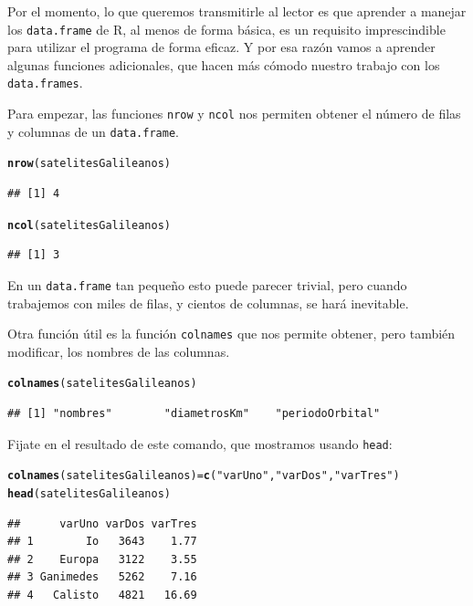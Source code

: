 \documentclass[10pt,a4paper]{article}\usepackage[]{graphicx}\usepackage[]{color}
\makeatletter
\newcommand{\hlstr}[1]{\textcolor[rgb]{0.192,0.494,0.8}{#1}}%
\newcommand{\hlstd}[1]{\textcolor[rgb]{0.345,0.345,0.345}{#1}}%
\newcommand{\hlkwb}[1]{\textcolor[rgb]{0.69,0.353,0.396}{#1}}%
\newcommand{\hlkwd}[1]{\textcolor[rgb]{0.737,0.353,0.396}{\textbf{#1}}}%
\newenvironment{kframe}{%
 \def\at@end@of@kframe{}%
 \ifinner\ifhmode%
  \def\at@end@of@kframe{\end{minipage}}%
  \begin{minipage}{\columnwidth}%
 \fi\fi%
 \def\FrameCommand##1{\hskip\@totalleftmargin \hskip-\fboxsep
 \colorbox{shadecolor}{##1}\hskip-\fboxsep
     \hskip-\linewidth \hskip-\@totalleftmargin \hskip\columnwidth}%
 \MakeFramed {\advance\hsize-\width
   \@totalleftmargin\z@ \linewidth\hsize
   \@setminipage}}%
 {\par\unskip\endMakeFramed%
 \at@end@of@kframe}
\newenvironment{knitrout}{}{} %
\makeatother
\begin{document}
Por el momento, lo que queremos transmitirle al lector es que aprender a manejar los {\tt data.frame} de R, al menos de forma básica, es un requisito imprescindible para utilizar el programa de forma eficaz. Y por esa razón vamos a aprender algunas funciones adicionales, que hacen más cómodo nuestro trabajo con los {\tt data.frames}.

Para empezar, las funciones {\tt nrow} y {\tt ncol} nos permiten obtener el número de filas y columnas de un {\tt data.frame}.
\begin{knitrout}
\color{fgcolor}\begin{kframe}
\begin{alltt}
\hlkwd{nrow}\hlstd{(satelitesGalileanos)}
\end{alltt}
\begin{verbatim}
## [1] 4
\end{verbatim}
\begin{alltt}
\hlkwd{ncol}\hlstd{(satelitesGalileanos)}
\end{alltt}
\begin{verbatim}
## [1] 3
\end{verbatim}
\end{kframe}
\end{knitrout}
En un {\tt data.frame} tan pequeño esto puede parecer trivial, pero cuando trabajemos con miles de filas, y cientos de columnas, se hará inevitable.

Otra función útil es la función {\tt colnames} que nos permite obtener, pero también modificar, los nombres de las columnas.
\begin{knitrout}
\color{fgcolor}\begin{kframe}
\begin{alltt}
\hlkwd{colnames}\hlstd{(satelitesGalileanos)}
\end{alltt}
\begin{verbatim}
## [1] "nombres"        "diametrosKm"    "periodoOrbital"
\end{verbatim}
\end{kframe}
\end{knitrout}
Fijate en el resultado de este comando, que mostramos usando {\tt head}:
\begin{knitrout}
\color{fgcolor}\begin{kframe}
\begin{alltt}
\hlkwd{colnames}\hlstd{(satelitesGalileanos)} \hlkwb{=} \hlkwd{c}\hlstd{(}\hlstr{"varUno"}\hlstd{,} \hlstr{"varDos"}\hlstd{,} \hlstr{"varTres"}\hlstd{)}
\hlkwd{head}\hlstd{(satelitesGalileanos)}
\end{alltt}
\begin{verbatim}
##      varUno varDos varTres
## 1        Io   3643    1.77
## 2    Europa   3122    3.55
## 3 Ganimedes   5262    7.16
## 4   Calisto   4821   16.69
\end{verbatim}
\end{kframe}
\end{knitrout}
\end{document}
